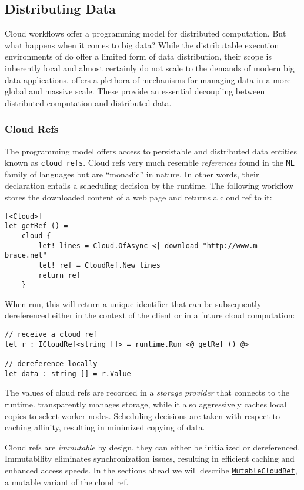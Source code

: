 \subsection{Distributing Data}

Cloud workflows offer a programming model for distributed computation.
But what happens when it comes to big data?
While the distributable execution environments of \mbrace{} do offer a
limited form of data distribution, their scope is inherently local
and almost certainly do not scale to the demands of modern big data applications.
\Mbrace{} offers a plethora of mechanisms for managing data in a more global and massive
scale. These provide an essential decoupling between distributed computation and
distributed data.

\subsubsection*{Cloud Refs}

The \mbrace{} programming model offers access to persistable and distributed data entities
known as \texttt{cloud refs}. Cloud refs very much resemble \emph{references} found in the 
\texttt{ML} family of languages but are “monadic” in nature. In other words, their declaration
entails a scheduling decision by the runtime. The following workflow stores the downloaded
content of a web page
and returns a cloud ref to it:
\begin{lstlisting}
[<Cloud>]
let getRef () =
    cloud {
        let! lines = Cloud.OfAsync <| download "http://www.m-brace.net"
        let! ref = CloudRef.New lines
        return ref
    }
\end{lstlisting}
When run, this will return a unique identifier that can be subsequently 
dereferenced either in the context of the client or in a future cloud computation:
\begin{lstlisting}
// receive a cloud ref
let r : ICloudRef<string []> = runtime.Run <@ getRef () @>

// dereference locally
let data : string [] = r.Value
\end{lstlisting}

The values of cloud refs are recorded in a \emph{storage provider} that
connects to the \mbrace{} runtime. \Mbrace{} transparently manages storage,
while it also aggressively caches local copies to select worker nodes.
Scheduling decisions are taken with respect to caching affinity, 
resulting in minimized copying of data.

Cloud refs are \emph{immutable} by design, they can either be initialized or dereferenced.
Immutability eliminates synchronization issues, resulting in efficient caching 
and enhanced access speeds. In the sections ahead we will describe
\hyperref[mutableCloudRef]{\texttt{MutableCloudRef}}, a mutable variant of the cloud ref.

